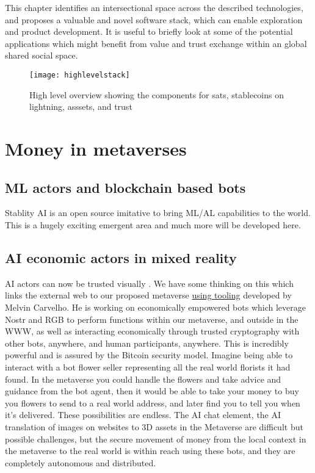 This chapter identifies an intersectional space across the described technologies, and proposes a valuable and novel software stack, which can enable exploration  and product development. It is useful to briefly look at some of the potential applications which might benefit from value and trust exchange within an global shared social space.

\begin{figure*}[ht]\centering 	\texttt{[image: highlevelstack]}
	\caption{High level overview showing the components for sats, stablecoins on lightning, asssets, and trust}
	\label{fig:highlevelstack}
\end{figure*}
\section{Money in metaverses}
\subsection{ML actors and blockchain based bots}
Stablity AI is an open source imitative to bring ML/AL capabilities to the world. This is a hugely exciting emergent area and much more will be developed here.
\subsection{AI economic actors in mixed reality}
AI actors can now be trusted visually \cite{nightingale2022ai}. We have some thinking on this which links the external web to our proposed metaverse \href{https://melbotz.github.io/melbot_20220713/}{using tooling} developed by Melvin Carvelho. He is working on economically empowered bots which leverage Nostr and RGB to perform functions within our metaverse, and outside in the WWW, as well as interacting economically through trusted cryptography with other bots, anywhere, and human participants, anywhere. This is incredibly powerful and is assured by the Bitcoin security model. Imagine being able to interact with a bot flower seller representing all the real world florists it had found. In the metaverse you could handle the flowers and take advice and guidance from the bot agent, then it would be able to take your money to buy you flowers to send to a real world address, and later find you to tell you when it's delivered. These possibilities are endless. The AI chat element, the AI translation of images on websites to 3D assets in the Metaverse are difficult but possible challenges, but the secure movement of money from the local context in the metaverse to the real world is within reach using these bots, and they are completely autonomous and distributed.
